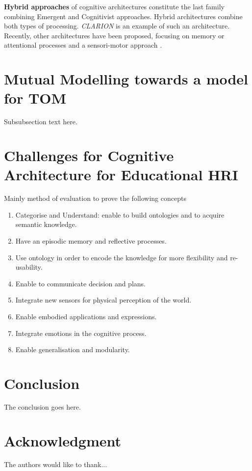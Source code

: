 \documentclass[conference]{IEEEtran}
\begin{document}
\textbf{Hybrid approaches} of cognitive architectures constitute the last family combining Emergent and Cognitivist approaches.
Hybrid architectures combine both types of processing. \textit{CLARION}  \cite{Sun2003} is an example of such an architecture.
Recently, other architectures have been proposed, focusing on memory \cite{baxter2013} or attentional processes and a sensori-motor approach \cite{demiris2006}.


\section{Mutual Modelling towards a model for TOM}
Subsubsection text here.



\section{Challenges for Cognitive Architecture for Educational HRI}
Mainly method of evaluation to prove the following concepts
\begin{enumerate}[noitemsep]
		\item Categorise and Understand: enable to build ontologies and to acquire semantic knowledge.
		\item Have an episodic memory and reflective processes.
		\item Use ontology in order to encode the knowledge for more flexibility and re-usability.
		\item Enable to communicate decision and plans.
		\item Integrate new sensors for physical perception of the world.
		\item Enable embodied applications and expressions.
		\item Integrate emotions in the cognitive process.
		\item Enable generalisation and modularity.
\end{enumerate}


\section{Conclusion}
The conclusion goes here.


\section*{Acknowledgment}


The authors would like to thank...









\end{document}
